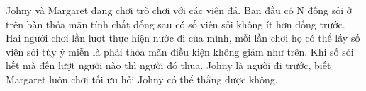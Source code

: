 Johny và Margaret đang chơi trò chơi với các viên đá. Ban đầu có N đống sỏi ở trên bàn thỏa mãn tính chất đống sau có số viên sỏi không ít hơn đống trước. Hai người chơi lần lượt thực hiện nước đi của mình, mỗi lần chơi họ có thể lấy số viên sỏi tùy ý miễn là phải thỏa mãn điều kiện không giảm như trên. Khi số sỏi hết mà đến lượt người nào thì người đó thua. Johny là người đi trước, biết Margaret luôn chơi tối ưu hỏi Johny có thể thắng được không.  

\